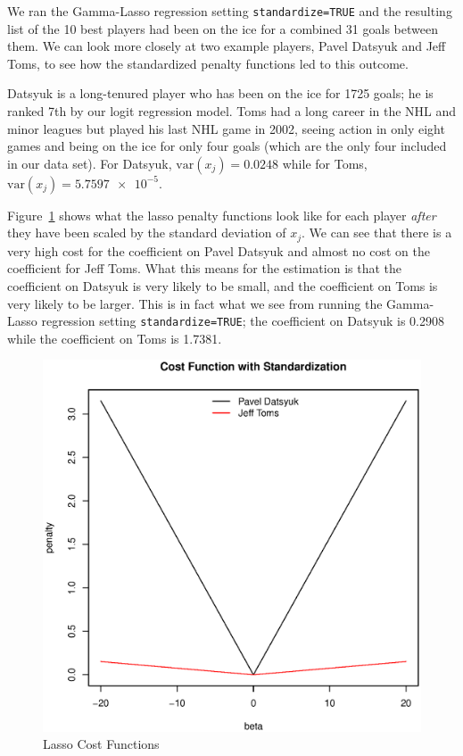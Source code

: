 \documentclass[11pt, fleqn]{article}
\begin{document}
We ran the Gamma-Lasso regression setting \texttt{standardize=TRUE} and the resulting list of the 10 best players had been on the ice for a combined 31 goals between them. We can look more closely at two example players, Pavel Datsyuk and Jeff Toms, to see how the standardized penalty functions led to this outcome.

Datsyuk is a long-tenured player who has been on the ice for 1725 goals; he is ranked 7th by our logit regression model. Toms had a long career in the NHL and minor leagues but played his last NHL game in 2002, seeing action in only eight games and being on the ice for only four goals (which are the only four included in our data set). For Datsyuk, $\mathrm{var}(x_j)=0.0248$ while for Toms, $\mathrm{var}(x_j)=\num{5.7597e-5}$.

Figure~\ref{fig:cost_fcn} shows what the lasso penalty functions look like for each player \textit{after} they have been scaled by the standard deviation of $x_j$. We can see that there is a very high cost for the coefficient on Pavel Datsyuk and almost no cost on the coefficient for Jeff Toms. What this means for the estimation is that the coefficient on Datsyuk is very likely to be small, and the coefficient on Toms is very likely to be larger. This is in fact what we see from running the Gamma-Lasso regression setting \texttt{standardize=TRUE}; the coefficient on Datsyuk is 0.2908 while the coefficient on Toms is 1.7381.

\begin{figure}[!htb]
  \centering
  \includegraphics[scale=.5]{cost_fcn.eps}
  \caption{Lasso Cost Functions}
  \label{fig:cost_fcn}
\end{figure}
\end{document}
